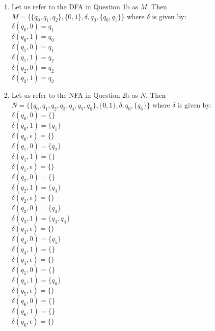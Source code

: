 \documentclass[a4paper, 12pt]{article}
\begin{document}
\begin{enumerate}
\begin{itemize}
\begin{figure}[H]
\end{figure}

\end{itemize}

\newpage
\item %
Let us refer to the DFA in Question 1b as $M$. Then 
$ M = \{\{q_0, q_1, q_2\}, \{0, 1\}, \delta, q_0, \{q_0, q_1\}\} $
where $ \delta $ is given by:\\
$\delta(q_0, 0) = q_1$\\
$\delta(q_0, 1) = q_0$\\
$\delta(q_1, 0) = q_1$\\
$\delta(q_1, 1) = q_2$\\
$\delta(q_2, 0) = q_2$\\
$\delta(q_2, 1) = q_2$\\
 
\item %
Let us refer to the NFA in Question 2b as $N$. Then 
$ N = \{\{q_0, q_1, q_2, q_3, q_4, q_5, q_6\}, \{0, 1\}, \delta, q_0, \{q_6\}\} $
where $ \delta $ is given by:\\
$\delta(q_0, 0) = \{\}$\\
$\delta(q_0, 1) = \{q_1\}$\\
$\delta(q_0, \epsilon) = \{\}$\\
$\delta(q_1, 0) = \{q_2\}$\\
$\delta(q_1, 1) = \{\}$\\
$\delta(q_1, \epsilon) = \{\}$\\
$\delta(q_2, 0) = \{\}$\\
$\delta(q_2, 1) = \{q_3\}$\\
$\delta(q_2, \epsilon) = \{\}$\\
$\delta(q_3, 0) = \{q_3\}$\\
$\delta(q_3, 1) = \{q_3, q_4\}$\\
$\delta(q_3, \epsilon) = \{\}$\\
$\delta(q_4, 0) = \{q_5\}$\\
$\delta(q_4, 1) = \{\}$\\
$\delta(q_4, \epsilon) = \{\}$\\
$\delta(q_5, 0) = \{\}$\\
$\delta(q_5, 1) = \{q_6\}$\\
$\delta(q_5, \epsilon) = \{\}$\\
$\delta(q_6, 0) = \{\}$\\
$\delta(q_6, 1) = \{\}$\\
$\delta(q_6, \epsilon) = \{\}$\\


\end{enumerate}
\end{document}
